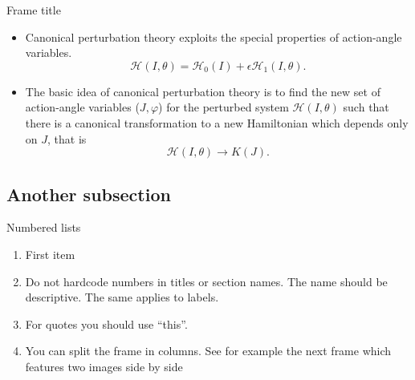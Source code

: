\documentclass[a4,compress]{beamer}
\theoremstyle{plain}
\theoremstyle{definition}
\begin{document}

\begin{frame}{Frame title}
  \begin{itemize}
    \item Canonical perturbation theory exploits
    the special properties of action-angle variables.
    \[
      \mathcal{H}(I, \theta) = \mathcal{H}_0(I) + \epsilon \mathcal{H}_1(I, \theta).
    \]
    \item The basic idea of canonical perturbation theory is to find the new set of
    action-angle variables (\(J, \varphi\)) for the perturbed system
    \(\mathcal{H}(I,\theta)\) such that there is a canonical transformation to
    a new Hamiltonian which depends only on $J$, that is
    \[
    \mathcal{H}(I,\theta) \to K(J).
    \]
  \end{itemize}

\end{frame}


\subsection[Short subs.]{Another subsection}

\begin{frame}{Numbered lists}
  \begin{enumerate}
    \item First item
    \item Do not hardcode numbers in titles or section names. The name should be descriptive. The same applies
			to labels.
    \item For quotes you should use ``this''.
	\item You can split the frame in columns. See for example the next frame which features two images side by side
  \end{enumerate}
\end{frame}

\end{document}
